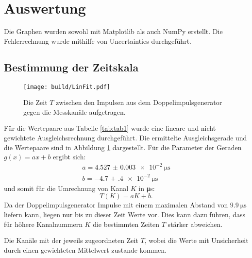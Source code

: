 \section{Auswertung}
\label{sec:Auswertung}


Die Graphen wurden sowohl mit Matplotlib \cite{matplotlib} als auch NumPy \cite{numpy} erstellt. Die
Fehlerrechnung wurde mithilfe von Uncertainties \cite{uncertainties} durchgeführt.


\subsection{Bestimmung der Zeitskala}
\begin{figure}
	\centering
	\texttt{[image: build/LinFit.pdf]}
	\caption{Die Zeit $T$ zwischen den Impulsen aus dem Doppelimpulsgenerator gegen die Messkanäle aufgetragen.}
	\label{fig:erste}
\end{figure}

Für die Wertepaare aus Tabelle \ref{tab:tab1}  wurde eine lineare und nicht gewichtete Ausgleichsrechnung durchgeführt. Die ermittelte Ausgleichsgerade und die Wertepaare sind in Abbildung \ref{fig:erste} dargestellt. Für die Parameter der Geraden $g(x)=a x + b$ ergibt sich:
\begin{gather*}
a=\SI{4.527(3)e-2}{\micro\second}\\
b=\SI{-4.7(4)e-2}{\micro\second}
\end{gather*}
und somit für die Umrechnung von Kanal $K$ in \si{\micro\second}:
\begin{equation}
T(K)=a K + b. \label{eq:umrechnung}
\end{equation}
Da der Doppelimpulsgenerator Impulse mit einem maximalen Abstand von $\SI{9.9}{\micro\second}$ liefern kann, liegen nur bis zu dieser Zeit Werte vor. Dies kann dazu führen, dass für höhere Kanalnummern $K$ die bestimmten Zeiten $T$ stärker abweichen.
\begin{table}
	\centering
	\caption{Die Kanäle mit der jeweils zugeordneten Zeit $T$, wobei die Werte mit Unsicherheit durch einen gewichteten Mittelwert zustande kommen.}
	
\end{table}
